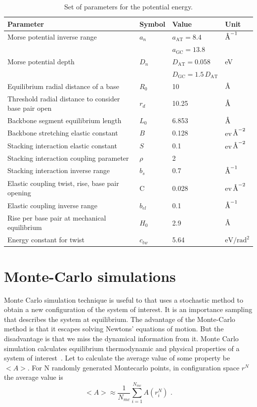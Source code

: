 \documentclass[12pt,masters,final]{UTRGVthesis}
\begin{document}
\begin{table} [!h]
\centering  
\begin{tabular}{ | l | l | l | l |} 
    \hline
    Parameter & Symbol & Value & Unit \\ \hline
    Morse potential inverse range & $a_n$ & $a_{\text{AT}} = 8.4$ & $\text{\normalfont\AA}^{-1}$ \\
    & & $a_{\text{GC}} = 13.8$ & \\ \hline
    Morse potential depth & $D_n$ & $D_{\text{AT}} = 0.058$ & eV \\
    & & $D_{\text{GC}} = 1.5 \, D_{\text{AT}}$ & \\ \hline
    Equilibrium radial distance of a base & $R_0$ & 10 & $\text{\normalfont\AA}$ \\ \hline
    Threshold radial distance to consider base pair open & $r_d$ & 10.25 & $\text{\normalfont\AA}$ \\ \hline
    Backbone segment equilibrium length & $L_0$ & 6.853 & $\text{\normalfont\AA}$ \\ \hline
    Backbone stretching elastic constant & $B$ & 0.128 & ev\,$\text{\normalfont\AA}^{-2}$ \\ \hline
    Stacking interaction elastic constant & $S$ & 0.1 & ev\,$\text{\normalfont\AA}^{-2}$ \\ \hline
    Stacking interaction coupling parameter & $\rho$ & 2 &  \\ \hline
    Stacking interaction inverse range & $b_s$ & 0.7 & $\text{\normalfont\AA}^{-1}$ \\ \hline
    Elastic coupling twist, rise, base pair opening & C & 0.028
    & ev\,$\text{\normalfont\AA}^{-2}$ \\ \hline 
    Elastic coupling inverse range & $b_{el}$ & 0.1 & $\text{\normalfont\AA}^{-1}$ \\ \hline
    Rise per base pair at mechanical equilibrium & $H_0$ & 2.9 & $\text{\normalfont\AA}$ \\ \hline
    Energy constant for twist & $c_{tw}$ & 5.64 & $\text{eV}/{\text{rad}^2}$ \\ \hline
    \hline
    \end{tabular}
    \caption{Set of parameters for the potential energy.}
    \label{table_parameters}
    \end{table}
\newpage
%
\section{Monte-Carlo simulations}
Monte Carlo simulation technique is useful to that uses a stochastic method to obtain a new configuration of the system of interest. It is an importance sampling that describes the system at equilibrium. The advantage of the Monte-Carlo method is that it escapes solving Newtons' equations of motion. But the disadvantage is that we miss the dynamical information from it. Monte Carlo simulation calculates equilibrium thermodynamic and physical properties of a system of interest~\cite{earl2008monte}. Let to calculate the average value of some property be $<A>$. For N randomly generated Montecarlo points, in configuration space $r^{N}$ the average value is \begin{equation}
<A>\approx \frac{1}{N_{mc}}\sum\limits_{i=1}^{N_{mc}} A(r_{i}^{N})\,\, .\end{equation}
 
\end{document}
